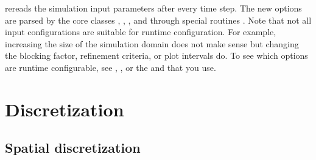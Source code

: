 \documentclass[letterpaper,10pt,english]{sphinxmanual}
\begin{document}
 re\sphinxhyphen{}reads the simulation input parameters after every time step.
The new options are parsed by the core classes , , , and  through special routines .
Note that not all input configurations are suitable for run\sphinxhyphen{}time configuration.
For example, increasing the size of the simulation domain does not make sense but changing the blocking factor, refinement criteria, or plot intervals do.
To see which options are run\sphinxhyphen{}time configurable, see {\hyperref[\detokenize{Source/Driver:chap-driver}]{}}, {\hyperref[\detokenize{Source/AmrMesh:chap-amrmesh}]{}}, or the {\hyperref[\detokenize{Source/TimeStepper:chap-timestepper}]{}} and {\hyperref[\detokenize{Source/CellTagger:chap-celltagger}]{}} that you use.


\chapter{Discretization}
\label{\detokenize{index:discretization}}

\section{Spatial discretization}
\label{\detokenize{Source/SpatialDiscretization:spatial-discretization}}\label{\detokenize{Source/SpatialDiscretization:chap-spatialdiscretization}}\label{\detokenize{Source/SpatialDiscretization::doc}}
\end{document}
